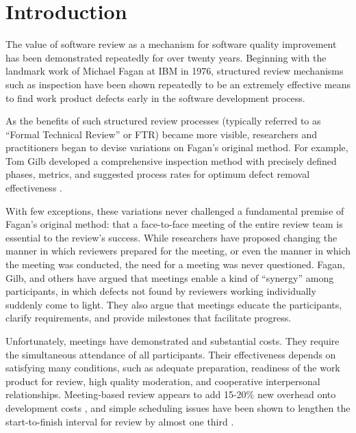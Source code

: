 
\section{Introduction}

The value of software review as a mechanism for software quality
improvement has been demonstrated repeatedly for over twenty years.
Beginning with the landmark work of Michael Fagan at IBM in 1976,
structured review mechanisms such as inspection have been shown repeatedly
to be an extremely effective means to find work product defects early in
the software development process. 

As the benefits of such structured review processes (typically referred to
as ``Formal Technical Review'' or FTR) became more visible, researchers and
practitioners began to devise variations on Fagan's original method.  For
example, Tom Gilb developed a comprehensive inspection method with
precisely defined phases, metrics, and suggested process rates for optimum
defect removal effectiveness \cite{Gilb93}.

With few exceptions, these variations never challenged a fundamental
premise of Fagan's original method: that a face-to-face meeting of the
entire review team is essential to the review's success. While researchers
have proposed changing the manner in which reviewers prepared for the 
meeting, or even the manner in which the meeting was conducted, the need 
for a meeting was never questioned. Fagan, Gilb, and others have argued 
that meetings enable a kind of ``synergy'' among participants, in which 
defects not found by reviewers working individually suddenly come to light.
They also argue that meetings educate the participants, clarify 
requirements, and provide milestones that facilitate progress.

Unfortunately, meetings have demonstrated and substantial costs. They 
require the simultaneous attendance of all participants. Their effectiveness
depends on satisfying many conditions, such as adequate preparation, 
readiness of the work product for review, high quality moderation, 
and cooperative interpersonal relationships.
Meeting-based review appears to add 15-20\% new overhead onto development
costs \cite{Russel:LargeInspections}, and simple scheduling issues have been shown to
lengthen the start-to-finish interval for review by almost one third
\cite{votta.1993}.


